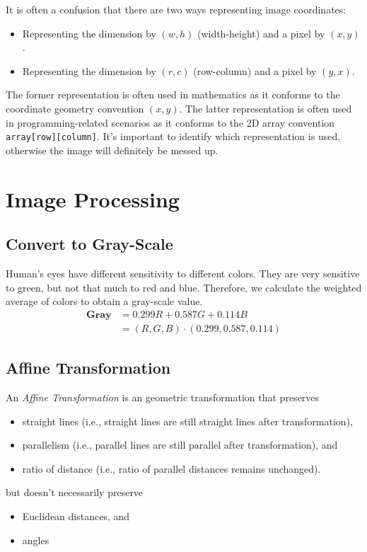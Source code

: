 \documentclass{note}
\begin{document}
\begin{important}
    It is often a confusion that there are two ways representing image coordinates: 
    \begin{itemize}
        \item Representing the dimension by $(w, h)$ (width-height) and a pixel by $(x, y)$.
        \item Representing the dimension by $(r, c)$ (row-column) and a pixel by $(y, x)$.
    \end{itemize}
    The former representation is often used in mathematics as it conforms to the coordinate geometry convention $(x, y)$. The latter representation is often used in programming-related scenarios as it conforms to the 2D array convention \texttt{array[row][column]}. It's important to identify which representation is used, otherwise the image will definitely be messed up.
\end{important}

\section{Image Processing}

\subsection{Convert to Gray-Scale}

Human's eyes have different sensitivity to different colors. They are very sensitive to green, but not that much to red and blue. Therefore, we calculate the weighted average of colors to obtain a gray-scale value.
\begin{align*}
    \mathbf{Gray} 
    & = 0.299 R + 0.587 G + 0.114 B \\
    & = (R, G, B) \cdot (0.299, 0.587, 0.114)
\end{align*}

\subsection{Affine Transformation}

An \textit{Affine Transformation} is an geometric transformation that preserves
\begin{itemize}
    \item straight lines (i.e., straight lines are still straight lines after transformation),
    \item parallelism (i.e., parallel lines are still parallel after transformation), and
    \item ratio of distance (i.e., ratio of parallel distances remains unchanged).
\end{itemize}
but doesn't necessarily preserve
\begin{itemize}
    \item Euclidean distances, and
    \item angles
\end{itemize}
\end{document}
